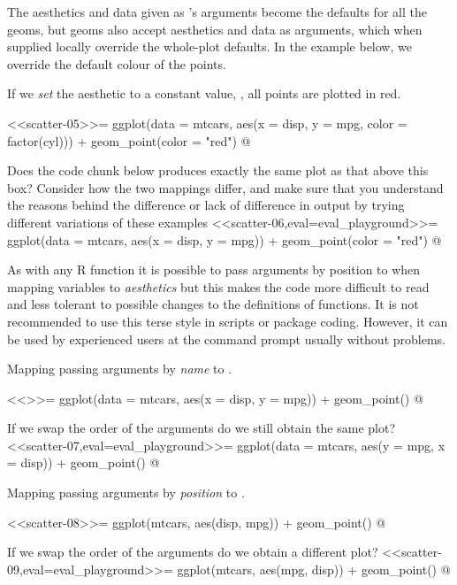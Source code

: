 \begin{warningbox}
The aesthetics and data given as 's arguments become the defaults for all the geoms, but geoms also accept aesthetics and data as arguments, which when supplied locally override the whole-plot defaults. In the example below, we override the default colour of the points.
\end{warningbox}

If we \emph{set} the  aesthetic to a constant value, , all points are plotted in red.

<<scatter-05>>=
ggplot(data = mtcars,
       aes(x = disp, y = mpg, color = factor(cyl))) +
  geom_point(color = "red")
@

\begin{playground}
Does the code chunk below produces exactly the same plot as that above this box? Consider how the two mappings differ, and make sure that you understand the reasons behind the difference or lack of difference in output by trying different variations of these examples
<<scatter-06,eval=eval_playground>>=
ggplot(data = mtcars,
       aes(x = disp, y = mpg)) +
  geom_point(color = "red")
@
\end{playground}

As with any R function it is possible to pass arguments by position to  when
mapping variables to \emph{aesthetics} but this
makes the code more difficult to read and less tolerant to possible changes to the
definitions of functions. It is not
recommended to use this terse style in scripts or package coding. However, it can
be used by experienced users at the command prompt usually without problems.

Mapping passing arguments by \emph{name} to .

<<>>=
ggplot(data = mtcars, aes(x = disp, y = mpg)) +
  geom_point()
@

\begin{playground}
If we swap the order of the arguments do we still obtain the same plot?
<<scatter-07,eval=eval_playground>>=
ggplot(data = mtcars, aes(y = mpg, x = disp)) +
  geom_point()
@
\end{playground}

Mapping passing arguments by \emph{position} to .

<<scatter-08>>=
ggplot(mtcars, aes(disp, mpg)) +
  geom_point()
@

\begin{playground}
If we swap the order of the arguments do we obtain a different plot?
<<scatter-09,eval=eval_playground>>=
ggplot(mtcars, aes(mpg, disp)) +
  geom_point()
@
\end{playground}


